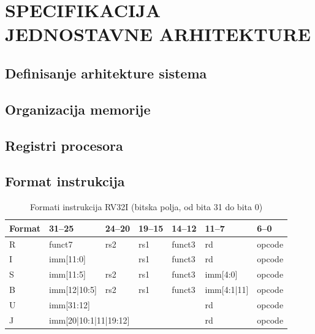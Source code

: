 \chapter{SPECIFIKACIJA JEDNOSTAVNE ARHITEKTURE}
\label{ch:specifikacija}


\section{Definisanje arhitekture sistema}
\label{sec:definisanje-arhitekture}

\section{Organizacija memorije}
\label{sec:memorija}

\section{Registri procesora}
\label{sec:registri}

\section{Format instrukcija}
\label{sec:format-instrukcija}

\begin{table}[H]
  \centering
  \caption{Formati instrukcija RV32I (bitska polja, od bita 31 do bita 0)}
  \label{tab:formati}
  \small
  \begin{tabular}{@{}lllllll@{}}
    \toprule
    Format & 31--25 & 24--20 & 19--15 & 14--12 & 11--7 & 6--0 \\
    \midrule
    R & funct7 & rs2 & rs1 & funct3 & rd & opcode \\
    I & \multicolumn{2}{l}{imm[11:0]} & rs1 & funct3 & rd & opcode \\
    S & imm[11:5] & rs2 & rs1 & funct3 & imm[4:0] & opcode \\
    B & imm[12|10:5] & rs2 & rs1 & funct3 & imm[4:1|11] & opcode \\
    U & \multicolumn{4}{l}{imm[31:12]} & rd & opcode \\
    J & \multicolumn{4}{l}{imm[20|10:1|11|19:12]} & rd & opcode \\
    \bottomrule
  \end{tabular}
\end{table}

